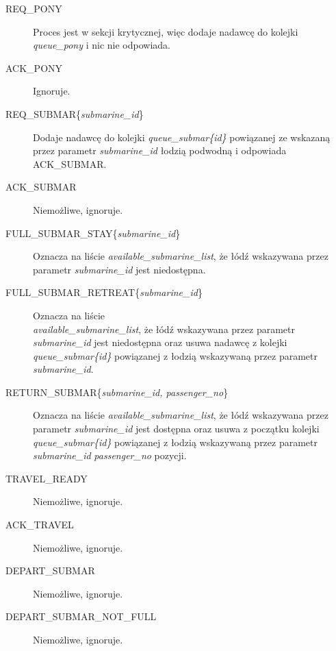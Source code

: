 \documentclass[a4paper]{article}
\begin{document}
\begin{description}
    \item [REQ\_PONY] Proces jest w sekcji krytycznej, więc dodaje nadawcę do kolejki \textit{queue\_pony} i nic nie odpowiada.
    \item [ACK\_PONY] Ignoruje.
    \item [REQ\_SUBMAR\{\textit{submarine\_id}\}] Dodaje nadawcę do kolejki \textit{queue\_submar\{id\}} powiązanej ze wskazaną przez parametr \textit{submarine\_id} łodzią podwodną i odpowiada ACK\_SUBMAR.
    \item [ACK\_SUBMAR] Niemożliwe, ignoruje.
    \item [FULL\_SUBMAR\_STAY\{\textit{submarine\_id}\}] Oznacza na liście \textit{available\_submarine\_list}, że łódź wskazywana przez parametr \textit{submarine\_id} jest niedostępna.
    \item [FULL\_SUBMAR\_RETREAT\{\textit{submarine\_id}\}] Oznacza na liście\\
     \textit{available\_submarine\_list}, że łódź wskazywana przez parametr \textit{submarine\_id} jest niedostępna oraz usuwa nadawcę z kolejki \textit{queue\_submar\{id\}} powiązanej z łodzią wskazywaną przez parametr \textit{submarine\_id}.
    \item [RETURN\_SUBMAR\{\textit{submarine\_id, passenger\_no}\}] Oznacza na liście \textit{available\_submarine\_list}, że łódź wskazywana przez parametr \textit{submarine\_id} jest dostępna
    oraz usuwa z początku kolejki \textit{queue\_submar\{id\}} powiązanej z łodzią wskazywaną przez parametr \textit{submarine\_id} \textit{passenger\_no} pozycji.
    \item [TRAVEL\_READY] Niemożliwe, ignoruje.
    \item [ACK\_TRAVEL] Niemożliwe, ignoruje.
    \item [DEPART\_SUBMAR] Niemożliwe, ignoruje.
    \item [DEPART\_SUBMAR\_NOT\_FULL] Niemożliwe, ignoruje.
\end{description}


\resetlinenumber[1]\linenumbers
\end{document}
